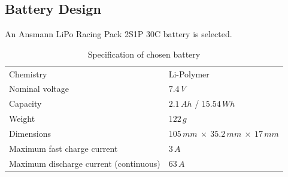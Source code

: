 \subsection{Battery Design}
%
An Ansmann \ac{LiPo} Racing Pack 2S1P 30C battery is selected. 
%
%
%
\begin{table}[H]
\centering
\caption{Specification of chosen battery}
\label{tab:proposed_battery}
\begin{tabular}{ll}
\hline
Chemistry & Li-Polymer\\
Nominal voltage & $7.4\,V$\\
Capacity & $2.1\,Ah$ / $15.54\,Wh$\\
Weight & $122\,g$\\
Dimensions & $105\,mm\:\times\:35.2\,mm\:\times\:17\,mm$\\
Maximum fast charge current & $3\,A$\\
Maximum discharge current (continuous) & $63\,A$\\
\hline
\end{tabular}
\end{table}
%
%
%
